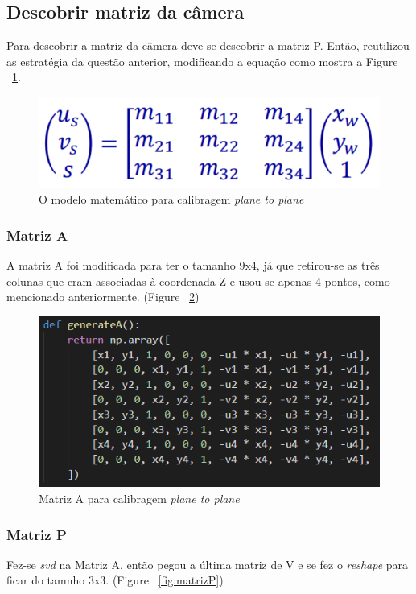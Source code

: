 \documentclass{article}
\begin{document}
    \subsection{Descobrir matriz da câmera}
    Para descobrir a matriz da câmera deve-se descobrir a matriz P. Então, reutilizou as estratégia da questão anterior, modificando a equação como mostra a Figure ~\ref{fig:planeToPlane}.
    \begin{figure}[h!]
    \includegraphics[scale=0.6]{planeToPlane.PNG}
    \caption{O modelo matemático para calibragem \textit{plane to plane}}
    \label{fig:planeToPlane}
    \end{figure}
        
        \subsubsection{Matriz A}
        A matriz A foi modificada para ter o tamanho 9x4, já que retirou-se as três colunas que eram associadas à coordenada Z e usou-se apenas 4 pontos, como mencionado anteriormente. (Figure ~\ref{fig:matrizA})
        
        \begin{figure}[h!]
        \includegraphics[scale=1]{matrizA.PNG}
        \caption{Matriz A para calibragem \textit{plane to plane}}
        \label{fig:matrizA}
        \end{figure}
        
        \subsubsection{Matriz P}
        Fez-se \textit{svd} na Matriz A, então pegou a última matriz de V e se fez o \textit{reshape} para ficar do tamnho 3x3. (Figure ~\ref{fig:matrizP})
        
\end{document}
